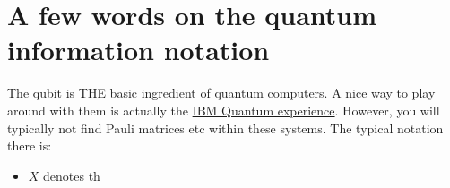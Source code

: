 \section{A few words on the quantum information notation}

The qubit is THE basic ingredient of quantum computers. A nice way to play around with them is actually the \href{https://quantum-computing.ibm.com/}{IBM Quantum experience}. However, you will typically not find Pauli matrices etc within these systems. The typical notation there is:
\begin{itemize}
\item $X$ denotes th
\end{itemize}